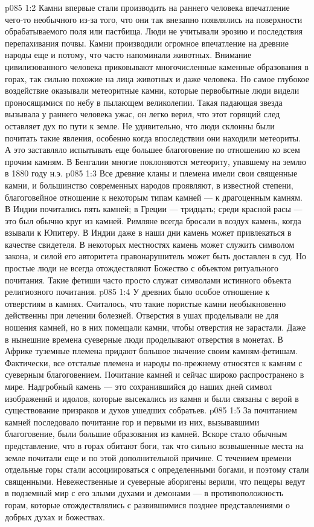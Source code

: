 \vs p085 1:2 Камни впервые стали производить на раннего человека впечатление чего\hyp{}то необычного из\hyp{}за того, что они так внезапно появлялись на поверхности обрабатываемого поля или пастбища. Люди не учитывали эрозию и последствия перепахивания почвы. Камни производили огромное впечатление на древние народы еще и потому, что часто напоминали животных. Внимание цивилизованного человека приковывают многочисленные каменные образования в горах, так сильно похожие на лица животных и даже человека. Но самое глубокое воздействие оказывали метеоритные камни, которые первобытные люди видели проносящимися по небу в пылающем великолепии. Такая падающая звезда вызывала у раннего человека ужас, он легко верил, что этот горящий след оставляет дух по пути к земле. Не удивительно, что люди склонны были почитать такие явления, особенно когда впоследствии они находили метеориты. А это заставляло испытывать еще большее благоговение по отношению ко всем прочим камням. В Бенгалии многие поклоняются метеориту, упавшему на землю в 1880 году н.э.
\vs p085 1:3 Все древние кланы и племена имели свои священные камни, и большинство современных народов проявляют, в известной степени, благоговейное отношение к некоторым типам камней --- к драгоценным камням. В Индии почитались пять камней; в Греции --- тридцать; среди красной расы --- это был обычно круг из камней. Римляне всегда бросали в воздух камень, когда взывали к Юпитеру. В Индии даже в наши дни камень может привлекаться в качестве свидетеля. В некоторых местностях камень может служить символом закона, и силой его авторитета правонарушитель может быть доставлен в суд. Но простые люди не всегда отождествляют Божество с объектом ритуального почитания. Такие фетиши часто просто служат символами истинного объекта религиозного почитания.
\vs p085 1:4 У древних было особое отношение к отверстиям в камнях. Считалось, что такие пористые камни необыкновенно действенны при лечении болезней. Отверстия в ушах проделывали не для ношения камней, но в них помещали камни, чтобы отверстия не зарастали. Даже в нынешние времена суеверные люди проделывают отверстия в монетах. В Африке туземные племена придают большое значение своим камням\hyp{}фетишам. Фактически, все отсталые племена и народы по\hyp{}прежнему относятся к камням с суеверным благоговением. Почитание камней и сейчас широко распространено в мире. Надгробный камень --- это сохранившийся до наших дней символ изображений и идолов, которые высекались из камня и были связаны с верой в существование призраков и духов ушедших собратьев.
\vs p085 1:5 За почитанием камней последовало почитание гор и первыми из них, вызывавшими благоговение, были большие образования из камней. Вскоре стало обычным представление, что в горах обитают боги, так что сильно возвышенные места на земле почитали еще и по этой дополнительной причине. С течением времени отдельные горы стали ассоциироваться с определенными богами, и поэтому стали священными. Невежественные и суеверные аборигены верили, что пещеры ведут в подземный мир с его злыми духами и демонами --- в противоположность горам, которые отождествлялись с развившимися позднее представлениями о добрых духах и божествах.
